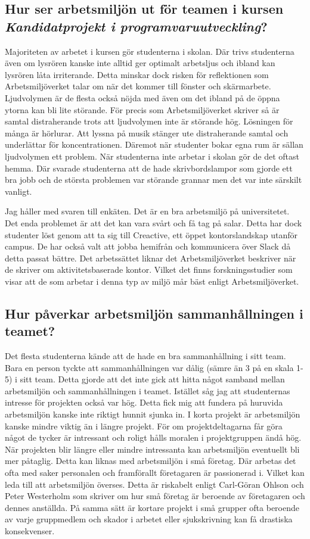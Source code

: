 \subsection{Hur ser arbetsmiljön ut för teamen i kursen \textit{Kandidatprojekt i programvaruutveckling}?}
Majoriteten av arbetet i kursen gör studenterna i skolan. Där trivs studenterna även om lysrören kanske inte alltid ger optimalt arbetsljus och ibland kan lysrören låta irriterande. Detta minskar dock risken för reflektionen som Arbetsmiljöverket talar om när det kommer till fönster och skärmarbete. Ljudvolymen är de flesta också nöjda med även om det ibland på de öppna ytorna kan bli lite störande. För precis som Arbetsmiljöverket skriver så är samtal distraherande trots att ljudvolymen inte är störande hög. Lösningen för många är hörlurar. Att lyssna på musik stänger ute distraherande samtal och underlättar för koncentrationen. Däremot när studenter bokar egna rum är sällan ljudvolymen ett problem. När studenterna inte arbetar i skolan gör de det oftast hemma. Där svarade studenterna att de hade skrivbordslampor som gjorde ett bra jobb och de största problemen var störande grannar men det var inte särskilt vanligt. 

Jag håller med svaren till enkäten. Det är en bra arbetsmiljö på universitetet. Det enda problemet är att det kan vara svårt och få tag på salar. Detta har dock studenter löst genom att ta sig till Creactive, ett öppet kontorslandskap utanför campus. De har också valt att jobba hemifrån och kommunicera över Slack då detta passat bättre. Det arbetssättet liknar det Arbetsmiljöverket beskriver när de skriver om aktivitetsbaserade kontor. Vilket det finns forskningsstudier som visar att de som arbetar i denna typ av miljö mår bäst enligt Arbetsmiljöverket.

\subsection{Hur påverkar arbetsmiljön sammanhållningen i teamet?}
Det flesta studenterna kände att de hade en bra sammanhållning i sitt team. Bara en person tyckte att sammanhållningen var dålig (sämre än 3 på en skala 1-5) i sitt team. Detta gjorde att det inte gick att hitta något samband mellan arbetsmiljön och sammanhållningen i teamet. Istället såg jag att studenternas intresse för projekten också var hög. Detta fick mig att fundera på huruvida arbetsmiljön kanske inte riktigt hunnit sjunka in. I korta projekt är arbetsmiljön kanske mindre viktig än i längre projekt. För om projektdeltagarna får göra något de tycker är intressant och roligt hålls moralen i projektgruppen ändå hög. När projekten blir längre eller mindre intressanta kan arbetsmiljön eventuellt bli mer påtaglig. Detta kan liknas med arbetsmiljön i små företag. Där arbetas det ofta med saker personalen och framförallt företagaren är passionerad i. Vilket kan leda till att arbetsmiljön överses. Detta är riskabelt enligt Carl-Göran Ohlson och Peter Westerholm som skriver om hur små företag är beroende av företagaren och dennes anställda. På samma sätt är kortare projekt i små grupper ofta beroende av varje gruppmedlem och skador i arbetet eller sjukskrivning kan få drastiska konsekvenser. 


